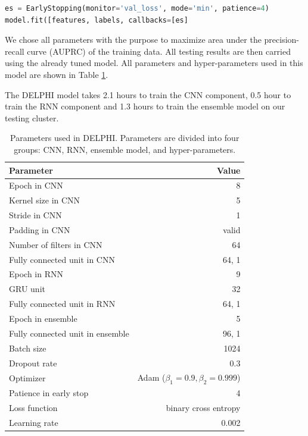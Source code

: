 \begin{lstlisting}[language=python,frame=single]
es = EarlyStopping(monitor='val_loss', mode='min', patience=4)
model.fit([features, labels, callbacks=[es]
\end{lstlisting}
We chose all parameters with the purpose to maximize area under the precision-recall curve (AUPRC) of the training data. All testing results are then carried using the already tuned model. All parameters and hyper-parameters used in this model are shown in Table \ref{tab_parameter}.

The DELPHI model takes 2.1 hours to train the CNN component, 0.5 hour to train the RNN component and 1.3 hours to train the ensemble model on our testing cluster.

\begin{table}[htbp]
  \centering
  \caption[Parameters used in DELPHI]{Parameters used in DELPHI. Parameters are divided into four groups: CNN, RNN, ensemble model, and hyper-parameters.}
    \begin{tabular}{lr}
    Parameter & Value \\
    \midrule
    \midrule
    Epoch in CNN & 8 \\
    Kernel size in CNN & 5 \\
    Stride in CNN & 1 \\
    Padding in CNN & valid \\
    Number of filters in CNN & 64 \\
    Fully connected unit in CNN & 64, 1 \\
    \midrule
    Epoch in RNN & 9 \\
    GRU unit & 32 \\
    Fully connected unit in RNN & 64, 1 \\
    \midrule
    Epoch in ensemble & 5 \\
    Fully connected unit in ensemble & 96, 1 \\
    \midrule
    Batch size & 1024 \\
    Dropout rate & 0.3 \\
    Optimizer & Adam ($\beta_1=0.9, \beta_2=0.999$) \\
    Patience in early stop & 4 \\
    Loss function & binary cross entropy \\
    Learning rate & 0.002 \\
    \bottomrule
    \end{tabular}%
  \label{tab_parameter}%
\end{table}%
